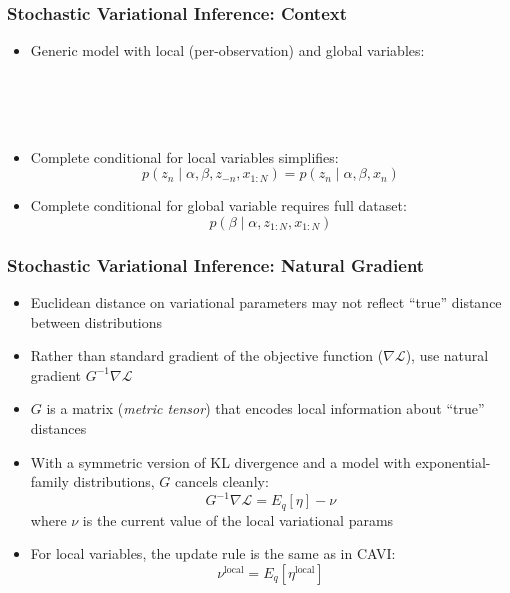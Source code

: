 \begin{frame}
\frametitle{Stochastic Variational Inference: Context}
\begin{itemize}[<+->]
\item Generic model with local (per-observation) and global variables:
\begin{center}
\end{center}
 \\
 \\
 \\
\item Complete conditional for local variables simplifies:
\[ p(z_n \mid \alpha, \beta, z_{-n}, x_{1:N}) = p(z_n \mid \alpha, \beta, x_n) \]
\item Complete conditional for global variable requires full dataset:
\[ p(\beta \mid \alpha, z_{1:N}, x_{1:N}) \]
\end{itemize}
\end{frame}

\begin{frame}
\frametitle{Stochastic Variational Inference: Natural Gradient}
\begin{itemize}[<+->]
\item Euclidean distance on variational parameters may not reflect ``true'' distance between distributions
\item Rather than standard gradient of the objective function ($\nabla \mathcal L$), use natural gradient $G^{-1} \nabla \mathcal L$
\item $G$ is a matrix (\emph{metric tensor}) that encodes local information about ``true'' distances
\item With a symmetric version of KL divergence and a model with exponential-family distributions, $G$ cancels cleanly:
\[ G^{-1} \nabla \mathcal L = E_q[\eta] - \nu \]
where $\nu$ is the current value of the local variational params
\item For local variables, the update rule is the same as in CAVI:
\[ \nu^{\text{local}} = E_q[\eta^{\text{local}}] \]
\end{itemize}
\end{frame}

